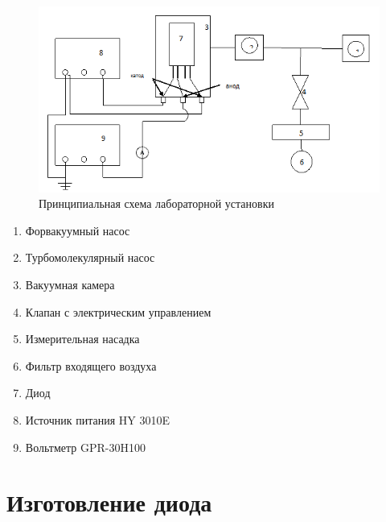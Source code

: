 \documentclass[a4paper]{article}
\begin{document}
\begin{figure}[h]
    \centering
    \includegraphics[width=13cm]{setup.png}
    \caption{Принципиальная схема лабораторной установки}
    \label{fig:vac}
\end{figure}
\begin{enumerate}
    \item Форвакуумный насос
\item Турбомолекулярный насос
\item Вакуумная камера
\item Клапан с электрическим управлением
\item Измерительная насадка
\item Фильтр входящего воздуха
\item Диод
\item Источник питания HY 3010E
\item Вольтметр GPR-30H100
\end{enumerate}

\section{Изготовление диода}
\end{document}
